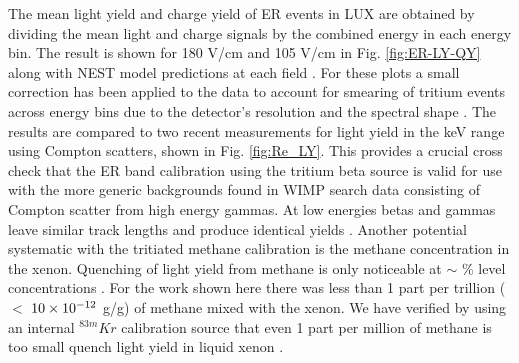 The mean light yield and charge yield of ER events in LUX are obtained by dividing the mean light and charge signals by the combined energy in each energy bin. The result is shown for 180 V/cm and 105 V/cm in Fig. \ref{fig:ER-LY-QY} along with NEST model predictions at each field \cite{NEST_2013}. For these plots a small correction has been applied to the data to account for smearing of tritium events across energy bins due to the detector's resolution and the spectral shape \cite{Dobi_Thesis}. 
The results are compared to two recent measurements for light yield in the keV range using Compton scatters, shown in Fig. \ref{fig:Re_LY}. This provides a crucial cross check that the ER band calibration using the tritium beta source is valid for use with the more generic backgrounds found in WIMP search data consisting of Compton scatter from high energy gammas. At low energies betas and gammas leave similar track lengths and produce identical yields \cite{NEST} \cite{NEST_2013}. Another potential systematic with the tritiated methane calibration is the methane concentration in the xenon. Quenching of light yield from methane is only noticeable at $\sim$ \% level concentrations \cite{Kirill_Methane}. For the work shown here there was less than 1 part per trillion ($<$ $\rm10\times10^{-12}$ g/g) of methane mixed with the xenon. We have verified by using an internal $^{83m}Kr$ calibration source that even 1 part per million of methane is too small quench light yield in liquid xenon \cite{Dobi_Thesis}.


